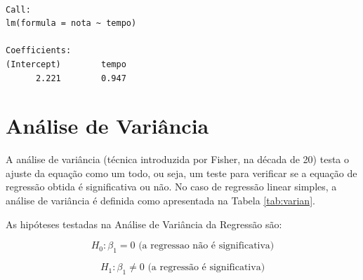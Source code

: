 \documentclass[12pt,brazil,oneside]{book}
\begin{document}
\begin{verbatim}

Call:
lm(formula = nota ~ tempo)

Coefficients:
(Intercept)        tempo  
      2.221        0.947  
\end{verbatim}

\hypertarget{analise-de-variancia}{%
\section{Análise de Variância}\label{analise-de-variancia}}

A análise de variância (técnica introduzida por Fisher, na década de 20) testa o ajuste da equação como um todo, ou seja, um teste para verificar se a equação de regressão obtida é significativa ou não. No caso de regressão linear simples, a análise de variância é definida como apresentada na Tabela \ref{tab:varian}.

As hipóteses testadas na Análise de Variância da Regressão são:

\[
H_0:\beta_1=0 \textrm{ (a regressao não é significativa)} 
\]

\[
H_1:\beta_1 \neq 0 \textrm{ (a regressão é significativa)}
\]
\end{document}
